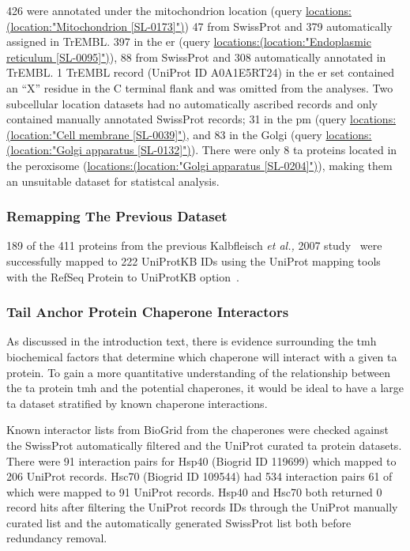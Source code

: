 426 were annotated under the mitochondrion location (query \url{locations:(location:"Mitochondrion [SL-0173]")}) 47 from SwissProt and 379 automatically assigned in TrEMBL.
397 in the \gls{er} (query \url{locations:(location:"Endoplasmic reticulum [SL-0095]")}), 88 from SwissProt and 308 automatically annotated in TrEMBL.
1 TrEMBL record (UniProt ID A0A1E5RT24) in the \gls{er} set contained an ``X'' residue in the C terminal flank and was omitted from the analyses.
Two subcellular location datasets had no automatically ascribed records and only contained manually annotated SwissProt records; 31 in the \gls{pm} (query \url{locations:(location:"Cell membrane [SL-0039]")}, and 83 in the Golgi (query \url{locations:(location:"Golgi apparatus [SL-0132]")}).
There were only 8 \gls{ta} proteins located in the peroxisome (\url{locations:(location:"Golgi apparatus [SL-0204]")}), making them an unsuitable dataset for statistcal analysis.

\subsubsection{Remapping The Previous Dataset}
189 of the 411 proteins from the previous Kalbfleisch \textit{et al.,} 2007 study~\cite{Kalbfleisch2007} were successfully mapped to 222 UniProtKB IDs using the UniProt mapping tools with the RefSeq Protein to UniProtKB option~\cite{TheUniProtConsortium2014}.

\subsubsection{Tail Anchor Protein Chaperone Interactors}
As discussed in the introduction text,  there is evidence surrounding the \gls{tmh} biochemical factors that determine which chaperone will interact with a given \gls{ta} protein.
To gain a more quantitative understanding of the relationship between the \gls{ta} protein \gls{tmh} and the potential chaperones, it would be ideal to have a large \gls{ta} dataset stratified by known chaperone interactions.

Known interactor lists from BioGrid from the chaperones were checked against the SwissProt automatically filtered and the UniProt curated \gls{ta} protein datasets.
There were 91 interaction pairs for Hsp40 (Biogrid ID 119699) which mapped to 206 UniProt records.
Hsc70 (Biogrid ID 109544) had 534 interaction pairs 61 of which were mapped to 91 UniProt records.
Hsp40 and Hsc70 both returned 0 record hits after filtering the UniProt records IDs through the UniProt manually curated list and the automatically generated SwissProt list both before redundancy removal.

